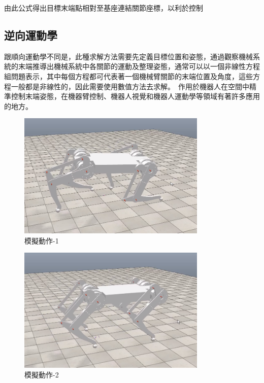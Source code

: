 由此公式得出目標末端點相對至基座連結關節座標，以利於控制\\

\subsection{逆向運動學}
跟順向運動學不同是，此種求解方法需要先定義目標位置和姿態，通過觀察機械系統的末端推導出機械系統中各關節的運動及整理姿態，通常可以以一個非線性方程組問題表示，其中每個方程都可代表著一個機械臂關節的末端位置及角度，這些方程一般都是非線性的，因此需要使用數值方法去求解。\
作用於機器人在空間中精準控制末端姿態，在機器臂控制、機器人視覺和機器人運動學等領域有著許多應用的地方。\\
\begin{figure}[hbt!]
\begin{center}
\includegraphics[width=9cm]{模擬動作-1}
\caption{\Large 模擬動作-1}\label{模擬動作-1}
\end{center}
\end{figure}

\begin{figure}[hbt!]
\begin{center}
\includegraphics[width=9cm]{模擬動作-2}
\caption{\Large 模擬動作-2}\label{模擬動作-2}
\end{center}
\end{figure}

